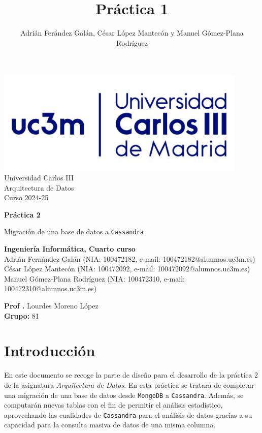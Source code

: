 \documentclass[]{article}
\title{Práctica 1}
\author{Adrián Ferández Galán, César López Mantecón y Manuel Gómez-Plana Rodríguez}
\begin{document}
\begin{titlepage}
    \centering
   \includegraphics[width=0.9\textwidth]{uc3m.jpg} 
    {\Huge Universidad Carlos III\\
    
     \Large Arquitectura de Datos\\
     \vspace{0.5cm}
     Curso 2024-25}
    \vspace{2cm}

    {\Huge \textbf{Práctica 2} \par}
    \vspace{0.5cm}
    {\Large Migración de una base de datos a \texttt{Cassandra} \par}
    \vspace{8cm}

   \textbf{Ingeniería Informática, Cuarto curso}\\
    \vspace{0.2cm} 
    Adrián Fernández Galán       (NIA: 100472182, e-mail: 100472182@alumnos.uc3m.es)\\
    César López Mantecón         (NIA: 100472092, e-mail: 100472092@alumnos.uc3m.es)\\
    Manuel Gómez-Plana Rodríguez (NIA: 100472310, e-mail: 100472310@alumnos.uc3m.es)
    \vspace{0.5cm}

   
    \textbf{Prof .} Lourdes Moreno López\\
    
    \textbf{Grupo: } 81   
    
\end{titlepage}
\newpage

\renewcommand{\contentsname}{\centering Índice}

\hypersetup{linkcolor=black}
\tableofcontents
\hypersetup{linkcolor=blue}
\newpage

\section{Introducción}
\label{sec:introduccion}
En este documento se recoge la parte de diseño para el desarrollo de la práctica 2 de la asignatura
\textit{Arquitectura de Datos}. En esta práctica se tratará de completar una
migración de una base de datos desde \texttt{MongoDB} a \texttt{Cassandra}.
Además, se computarán nuevas tablas con el fin de permitir el análisis
estadístico, aprovechando las cualidades de \texttt{Cassandra} para el análisis
de datos gracias a su capacidad para la consulta masiva de datos de una misma
columna.
\end{document}
